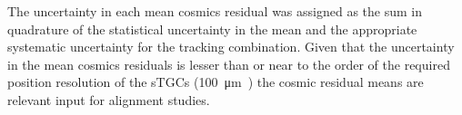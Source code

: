 The uncertainty in each mean cosmics residual was assigned as the sum in quadrature of the statistical uncertainty in the mean and the appropriate systematic uncertainty for the tracking combination. Given that the uncertainty in the mean cosmics residuals is lesser than or near to the order of the required position resolution of the sTGCs (\SI{100}{\micro\meter}~\cite{nsw_tdr}) the cosmic residual means are relevant input for alignment studies.